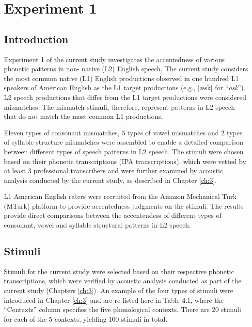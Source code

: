 \chapter{Experiment 1}
\label{ch:4}

\section{Introduction}

Experiment 1 of the current study investigates the accentedness of various phonetic patterns in non- native (L2) English speech. The current study considers the most common native (L1) English productions observed in one hundred L1 speakers of American English as the L1 target productions (e.g., [æsk] for “\textit{ask}”). L2 speech productions that differ from the L1 target productions were considered mismatches. The mismatch stimuli, therefore, represent patterns in L2 speech that do not match the most common L1 productions.

Eleven types of consonant mismatches, 5 types of vowel mismatches and 2 types of syllable structure mismatches were assembled to enable a detailed comparison between different types of speech patterns in L2 speech. The stimuli were chosen based on their phonetic transcriptions (IPA transcriptions), which were vetted by at least 3 professional transcribers and were further examined by acoustic analysis conducted by the current study, as described in Chapter \ref{ch:3}.

L1 American English raters were recruited from the Amazon Mechanical Turk (MTurk) platform to provide accentedness judgments on the stimuli. The results provide direct comparisons between the accentendess of different types of consonant, vowel and syllable structural patterns in L2 speech.


\section{Stimuli}

Stimuli for the current study were selected based on their respective phonetic transcriptions, which were verified by acoustic analysis conducted as part of the current study (Chapters \ref{ch:3}). An example of the four types of stimuli were introduced in Chapter \ref{ch:3} and are re-listed here in Table 4.1, where the “Contexts” column specifies the five phonological contexts. There are 20 stimuli for each of the 5 contexts, yielding 100 stimuli in total.

